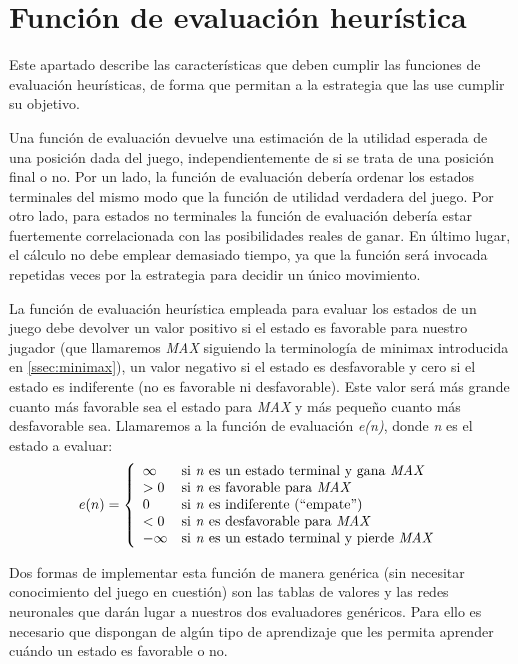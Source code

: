 \section{Función de evaluación heurística}
\label{sec:funcion_evaluacion_heuristica}
Este apartado describe las características que deben cumplir las funciones de evaluación heurísticas, de forma que permitan a la estrategia que las use cumplir su objetivo.

\bigskip
Una función de evaluación devuelve una estimación de la utilidad esperada de una posición dada del juego, independientemente de si se trata de una posición final o no.
Por un lado, la función de evaluación debería ordenar los estados terminales del mismo modo que la función de utilidad verdadera del juego.
Por otro lado, para estados no terminales la función de evaluación debería estar fuertemente correlacionada con las posibilidades reales de ganar.
En último lugar, el cálculo no debe emplear demasiado tiempo, ya que la función será invocada repetidas veces por la estrategia para decidir un único movimiento.

La función de evaluación heurística empleada para evaluar los estados de un juego debe devolver un valor positivo si el estado es favorable para nuestro jugador (que llamaremos \textit{MAX} siguiendo la terminología de minimax introducida en \ref{ssec:minimax}), un valor negativo si el estado es desfavorable y cero si el estado es indiferente (no es favorable ni desfavorable).
Este valor será más grande cuanto más favorable sea el estado para \textit{MAX} y más pequeño cuanto más desfavorable sea.
Llamaremos a la función de evaluación \textit{e(n)}, donde \textit{n} es el estado a evaluar:
\begin{equation}
e(n) = \left\{\begin{array}{ll}
\infty & \textnormal{si \textit{n} es un estado terminal y gana \textit{MAX}}\\
>0 & \textnormal{si \textit{n} es favorable para \textit{MAX}}\\
0 & \textnormal{si \textit{n} es indiferente (``empate'')}\\
<0 & \textnormal{si \textit{n} es desfavorable para \textit{MAX}}\\
-\infty & \textnormal{si \textit{n} es un estado terminal y pierde \textit{MAX}}\\
\end{array}\right. \label{eq:heuristico}
\end{equation}

Dos formas de implementar esta función de manera genérica (sin necesitar conocimiento del juego en cuestión) son las tablas de valores y las redes neuronales que darán lugar a nuestros dos evaluadores genéricos.
Para ello es necesario que dispongan de algún tipo de aprendizaje que les permita aprender cuándo un estado es favorable o no.

